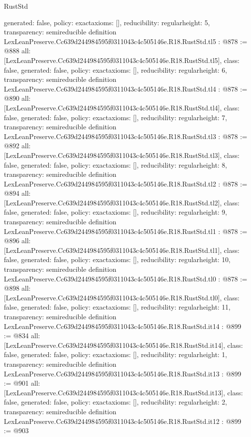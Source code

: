 \begin{lexlean}{RustStd}
\begin{coremodule}
{  generated: false,
  policy: exact{axioms: []},
  reducibility: regular{height: 5},
  transparency: semireducible
}
definition LexLeanPreserve.Cc639d244984595f0311043c4c505146e.R18.RustStd.tl5 : @878 := @888 {
  all: [LexLeanPreserve.Cc639d244984595f0311043c4c505146e.R18.RustStd.tl5],
  class: false,
  generated: false,
  policy: exact{axioms: []},
  reducibility: regular{height: 6},
  transparency: semireducible
}
definition LexLeanPreserve.Cc639d244984595f0311043c4c505146e.R18.RustStd.tl4 : @878 := @890 {
  all: [LexLeanPreserve.Cc639d244984595f0311043c4c505146e.R18.RustStd.tl4],
  class: false,
  generated: false,
  policy: exact{axioms: []},
  reducibility: regular{height: 7},
  transparency: semireducible
}
definition LexLeanPreserve.Cc639d244984595f0311043c4c505146e.R18.RustStd.tl3 : @878 := @892 {
  all: [LexLeanPreserve.Cc639d244984595f0311043c4c505146e.R18.RustStd.tl3],
  class: false,
  generated: false,
  policy: exact{axioms: []},
  reducibility: regular{height: 8},
  transparency: semireducible
}
definition LexLeanPreserve.Cc639d244984595f0311043c4c505146e.R18.RustStd.tl2 : @878 := @894 {
  all: [LexLeanPreserve.Cc639d244984595f0311043c4c505146e.R18.RustStd.tl2],
  class: false,
  generated: false,
  policy: exact{axioms: []},
  reducibility: regular{height: 9},
  transparency: semireducible
}
definition LexLeanPreserve.Cc639d244984595f0311043c4c505146e.R18.RustStd.tl1 : @878 := @896 {
  all: [LexLeanPreserve.Cc639d244984595f0311043c4c505146e.R18.RustStd.tl1],
  class: false,
  generated: false,
  policy: exact{axioms: []},
  reducibility: regular{height: 10},
  transparency: semireducible
}
definition LexLeanPreserve.Cc639d244984595f0311043c4c505146e.R18.RustStd.tl0 : @878 := @898 {
  all: [LexLeanPreserve.Cc639d244984595f0311043c4c505146e.R18.RustStd.tl0],
  class: false,
  generated: false,
  policy: exact{axioms: []},
  reducibility: regular{height: 11},
  transparency: semireducible
}
definition LexLeanPreserve.Cc639d244984595f0311043c4c505146e.R18.RustStd.it14 : @899 := @834 {
  all: [LexLeanPreserve.Cc639d244984595f0311043c4c505146e.R18.RustStd.it14],
  class: false,
  generated: false,
  policy: exact{axioms: []},
  reducibility: regular{height: 1},
  transparency: semireducible
}
definition LexLeanPreserve.Cc639d244984595f0311043c4c505146e.R18.RustStd.it13 : @899 := @901 {
  all: [LexLeanPreserve.Cc639d244984595f0311043c4c505146e.R18.RustStd.it13],
  class: false,
  generated: false,
  policy: exact{axioms: []},
  reducibility: regular{height: 2},
  transparency: semireducible
}
definition LexLeanPreserve.Cc639d244984595f0311043c4c505146e.R18.RustStd.it12 : @899 := @903 {
}
\end{coremodule}
\end{lexlean}
